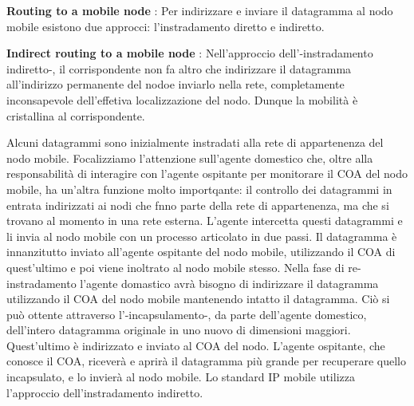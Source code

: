 \documentclass[a4paper,10pt]{article} %
\renewcommand{\b}[1]{%
    {\textbf{#1}}}
\begin{document}
\b{ Routing to a mobile node }: Per indirizzare e inviare il datagramma al nodo mobile esistono due approcci: l'instradamento diretto e indiretto.

\b{ Indirect routing to a mobile node }: Nell'approccio dell'-instradamento indiretto-, il corrispondente non fa altro che indirizzare il datagramma all'indirizzo permanente del nodoe inviarlo nella rete, completamente inconsapevole dell'effetiva localizzazione del nodo. Dunque la mobilità è cristallina al corrispondente. 

Alcuni datagrammi sono inizialmente instradati alla rete di appartenenza del nodo mobile. Focalizziamo l'attenzione sull'agente domestico che, oltre alla responsabilità di interagire con l'agente ospitante per monitorare il COA del nodo mobile, ha un'altra funzione molto importqante: il controllo dei datagrammi in entrata indirizzati ai nodi che fnno parte della rete di appartenenza, ma che si trovano al momento in una rete esterna. L'agente intercetta questi datagrammi e li invia al nodo mobile con un processo articolato in due passi. Il datagramma è innanzitutto inviato all'agente ospitante del nodo mobile, utilizzando il COA di quest'ultimo e poi viene inoltrato al nodo mobile stesso. Nella fase di re-instradamento l'agente domastico avrà bisogno di indirizzare il datagramma utilizzando il COA del nodo mobile mantenendo intatto il datagramma. Ciò si può ottente attraverso l'-incapsulamento-, da parte dell'agente domestico, dell'intero datagramma originale in uno nuovo di dimensioni maggiori. Quest'ultimo è indirizzato e inviato al COA del nodo. L'agente ospitante, che conosce il COA, riceverà e aprirà il datagramma più grande per recuperare quello incapsulato, e lo invierà al nodo mobile. Lo standard IP mobile utilizza l'approccio dell'instradamento indiretto.
\end{document}
